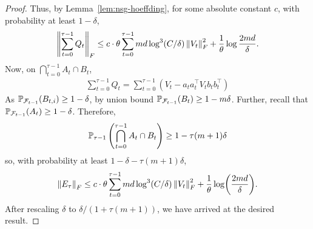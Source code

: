 \begin{proof}
Thus, by Lemma~\ref{lem:nsg-hoeffding}, for some absolute constant $c$, with probability at least $1-\delta$,
\begin{align*}
    \left \|\sum_{t=0}^{\tau-1} Q_t \right\|_F \leq c \cdot \theta \sum_{t=0}^{\tau-1} md \log^{3}(C/\delta) \left\lVert V_t \right\rVert_F^2 + \frac{1}{\theta} \log \frac{2md}{\delta}.
\end{align*}
Now, on $\bigcap_{t=0}^{\tau-1} A_t \cap B_t$,
\begin{align*}
    \sum_{t=0}^{\tau-1} Q_t = \sum_{t=0}^{\tau-1} (V_t - a_ta_t^\top V_t b_tb_t^\top)
\end{align*}
As $\mathbb{P}_{\mathcal F_{t-1}}\qty(B_{t,i}) \geq 1-\delta$, by union bound $\mathbb{P}_{\mathcal F_{t-1}}\qty(B_t) \geq 1-m \delta$. Further, recall that $\mathbb{P}_{\mathcal F_{t-1}}\qty(A_t) \geq 1-\delta$. Therefore,
\begin{align*}
    \mathbb{P}_{\tau-1} \left(\bigcap_{t=0}^{\tau-1} A_t \cap B_t \right) \geq 1 - \tau(m+1)\delta
\end{align*}
so, with probability at least $1-\delta - \tau(m+1)\delta$, 
\begin{align*}
    \left \| E_\tau \right \|_F \leq c \cdot \theta \sum_{t=0}^{\tau-1} md \log^{3}(C/\delta) \left\lVert V_t \right\rVert_F^2 + \frac{1}{\theta} \log(\frac{2md}{\delta}).
\end{align*}
After rescaling $\delta$ to $\delta / (1 + \tau (m+1))$, we have arrived at the desired result.
\end{proof}


